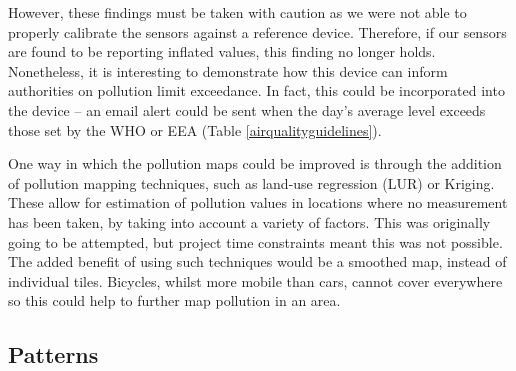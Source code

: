\documentclass[11pt,twosided,a4paper]{report}
\begin{document}
However, these findings must be taken with caution as we were not able to properly calibrate the sensors against a reference device. Therefore, if our sensors are found to be reporting inflated values, this finding no longer holds. Nonetheless, it is interesting to demonstrate how this device can inform authorities on pollution limit exceedance. In fact, this could be incorporated into the device -- an email alert could be sent when the day's average level exceeds those set by the WHO or EEA (Table \ref{airqualityguidelines}). 


One way in which the pollution maps could be improved is through the addition of pollution mapping techniques, such as land-use regression (LUR) or Kriging. These allow for estimation of pollution values in locations where no measurement has been taken, by taking into account a variety of factors. This was originally going to be attempted, but project time constraints meant this was not possible. The added benefit of using such techniques would be a smoothed map, instead of individual tiles. Bicycles, whilst more mobile than cars, cannot cover everywhere so this could help to further map pollution in an area.



\subsection{Patterns}
\end{document}
